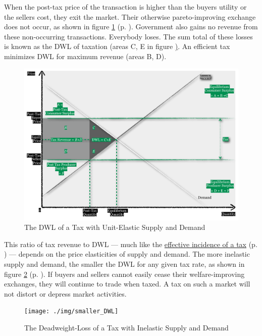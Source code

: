 When the post-tax price of the transaction is higher than the buyers utility or the sellers cost, they exit the market. Their otherwise pareto-improving exchange does not occur, as shown in figure \ref{fig:DWL} (p. \pageref{fig:DWL}). Government also gains no revenue from these non-occurring transactions. Everybody loses. The sum total of these losses is known as the \gls{DWL} of taxation (areas C, E in figure \href{fig:DWL}). An efficient tax minimizes \gls{DWL} for maximum revenue (areas B, D).

\begin{figure}[htbp]
	\centering
	\includegraphics[width=1\textwidth]{./img/DWL}  
	\caption[Deadweight-Loss of a Tax with Unit-Elastic Supply and Demand]{The \gls{DWL} of a Tax with Unit-Elastic Supply and Demand}
	\label{fig:DWL}
\end{figure}

This ratio of tax revenue to \gls{DWL} --- much like the \hyperref[sec:well-determined_incidence]{effective incidence of a tax} (p. \pageref{sec:well-determined_incidence}) --- depends on the price elasticities of supply and demand. The more inelastic supply and demand, the smaller the \gls{DWL} for any given tax rate, as shown in figure \ref{fig:smaller_DWL} (p. \pageref{fig:smaller_DWL}). If buyers and sellers cannot easily cease their welfare-improving exchanges, they will continue to trade when taxed. A tax on such a market will not distort or depress market activities.

\begin{figure}[htbp]
	\centering
	\texttt{[image: ./img/smaller\_DWL]}  
	\caption[Deadweight-Loss of a Tax with Inelastic Suppy and Demand]{The Deadweight-Loss of a Tax with Inelastic Supply and Demand}
	\label{fig:smaller_DWL}
\end{figure}

